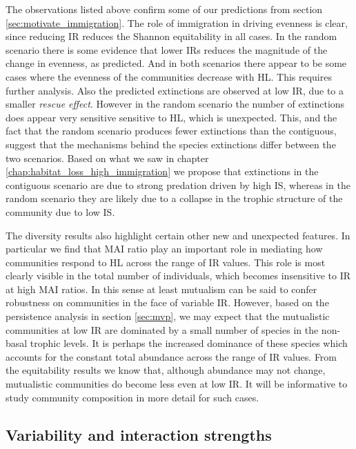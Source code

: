 The observations listed above confirm some of our predictions from section \ref{sec:motivate_immigration}. The role of immigration in driving evenness is clear, since reducing IR reduces the Shannon equitability in all cases. In the random scenario there is some evidence that lower IRs reduces the magnitude of the change in evenness, as predicted. And in both scenarios there appear to be some cases where the evenness of the communities decrease with HL. This requires further analysis. Also the predicted extinctions are observed at low IR, due to a smaller \emph{rescue effect}. However in the random scenario the number of extinctions does appear very sensitive sensitive to HL, which is unexpected. This, and the fact that the random scenario produces fewer extinctions than the contiguous, suggest that the mechanisms behind the species extinctions differ between the two scenarios. Based on what we saw in chapter \ref{chap:habitat_loss_high_immigration} we propose that extinctions in the contiguous scenario are due to strong predation driven by high IS, whereas in the random scenario they are likely due to a collapse in the trophic structure of the community due to low IS.

The diversity results also highlight certain other new and unexpected features. In particular we find that MAI ratio play an important role in mediating how communities respond to HL across the range of IR values. This role is most clearly visible in the total number of individuals, which becomes insensitive to IR at high MAI ratios. In this sense at least mutualism can be said to confer robustness on communities in the face of variable IR. However, based on the persistence analysis in section \ref{sec:mvp}, we may expect that the mutualistic communities at low IR are dominated by a small number of species in the non-basal trophic levels. It is perhaps the increased dominance of these species which accounts for the constant total abundance across the range of IR values. From the equitability results we know that, although abundance may not change, mutualistic communities do become less even at low IR. It will be informative to study community composition in more detail for such cases.


\subsection{Variability and interaction strengths}
\label{sec:vir_variability}

